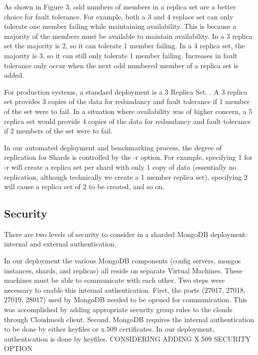 \documentclass[9pt,twocolumn,twoside]{styles/osajnl}
\begin{document}
As shown in Figure 3, odd numbers of members in a replica set are a better choice for fault tolerance. For example, both a 3 and 4 replace set can only tolerate one member failing while maintaining availability.  This is because a majority of the members must be available to maintain availability.  In a 3 replica set the majority is 2, so it can tolerate 1 member failing.  In a 4 replica set, the majority is 3, so it can still only tolerate 1 member failing.  Increases in fault tolerance only occur when the next odd numbered member of a replica set is added.  \cite{www-mongoRepDep}

For production systems, a standard deployment is a 3 Replica Set.  \cite{www-mongoRepDep}.  A 3 replica set provides 3 copies of the data for redundancy and fault tolerance if 1 member of the set were to fail.  In a situation where availability was of higher concern, a 5 replica set would provide 4 copies of the data for redundancy and fault tolerance if 2 members of the set were to fail.

In our automated deployment and benchmarking process, the degree of replication for Shards is controlled by the -r option. For example, specifying 1 for -r will create a replica set per shard with only 1 copy of data (essentially no replication, although technically we create a 1 member replica set), specifying 2 will cause a replica set of 2 to be created, and so on.

\subsection{Security}

There are two levels of security to consider in a sharded MongoDB deployment: internal and external authentication.

In our deployment the various MongoDB components (config servers, mongos instances, shards, and replicas) all reside on separate Virtual Machines.  These machines must be able to communicate with each other.  Two steps were necessary to enable this internal authentication.  First, the ports (27017, 27018, 27019, 28017) used by MongoDB needed to be opened for communication.  This was accomplished by adding appropriate security group rules to the clouds through Cloudmesh client.  Second, MongoDB requires the internal authentication to be done by either keyfiles or x.509 certificates.  \cite{www-mongoAuth}  In our deployment, authentication is done by keyfiles. CONSIDERING ADDING X.509 SECURITY OPTION
\end{document}
